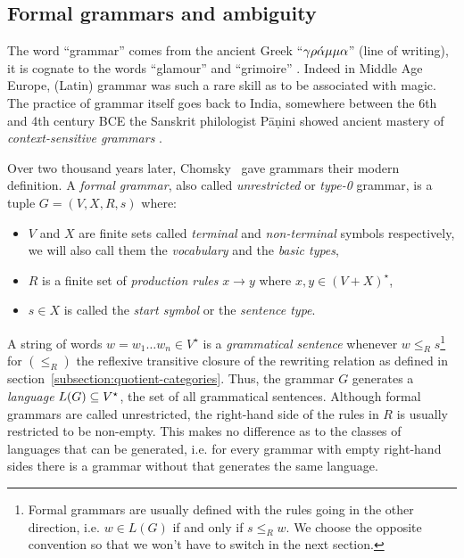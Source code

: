 
\subsection{Formal grammars and ambiguity}

The word ``grammar'' comes from the ancient Greek ``$\rm{\gamma \rho\acute{\alpha}\mu\mu\alpha}$'' (line of writing), it is cognate to the words ``glamour'' and ``grimoire'' \cite{RuppliThorel05, Davies10, Lambek14}.
Indeed in Middle Age Europe, (Latin) grammar was such a rare skill as to be associated with magic.
The practice of grammar itself goes back to India, somewhere between the 6th and 4th century BCE the Sanskrit philologist P\={a}\d{n}ini showed ancient mastery of \emph{context-sensitive grammars} \cite{BhateKak93}.

Over two thousand years later, Chomsky~\cite{Chomsky56,Chomsky57} gave grammars their modern definition.
A \emph{formal grammar}, also called \emph{unrestricted} or \emph{type-0} grammar, is a tuple $G = (V, X, R, s)$ where:
\begin{itemize}
    \item $V$ and $X$ are finite sets called \emph{terminal} and \emph{non-terminal} symbols respectively, we will also call them the \emph{vocabulary} and the \emph{basic types},
    \item $R$ is a finite set of \emph{production rules} $x \to y$ where $x, y \in (V + X)^\star$,
    \item $s \in X$ is called the \emph{start symbol} or the \emph{sentence type}.
\end{itemize}
A string of words $w = w_1 \dots w_n \in V^\star$ is a \emph{grammatical sentence} whenever $w \leq_R s$\footnote
{Formal grammars are usually defined with the rules going in the other direction, i.e. $w \in L(G)$ if and only if $s \leq_R w$.
We choose the opposite convention so that we won't have to switch in the next section.}
for $(\leq_R)$ the reflexive transitive closure of the rewriting relation as defined in section~\ref{subsection:quotient-categories}.
Thus, the grammar $G$ generates a \emph{language} $L(G) \subseteq V^\star$, the set of all grammatical sentences.
Although formal grammars are called unrestricted, the right-hand side of the rules in $R$ is usually restricted to be non-empty.
This makes no difference as to the classes of languages that can be generated, i.e. for every grammar with empty right-hand sides there is a grammar without that generates the same language.

